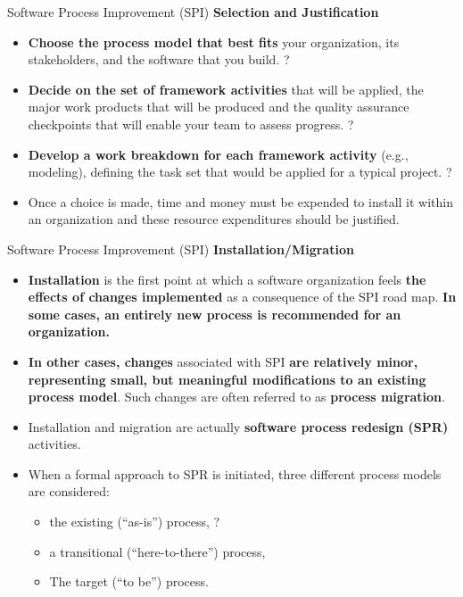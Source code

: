 \documentclass{beamer}
\begin{document}
\begin{frame}{Software Process Improvement (SPI)}
	\textbf{Selection and Justification}
	\begin{itemize}
		\item \textbf{Choose the process model that best fits} your organization, its stakeholders, and the software that you build. ?
		\item \textbf{Decide on the set of framework activities }that will be applied, the major work products that will be produced and the quality assurance checkpoints that will enable your team to assess progress. ?
		\item \textbf{Develop a work breakdown for each framework activity} (e.g., modeling), defining the task set that would be applied for a typical project. ?
		\item Once a choice is made, time and money must be expended to install it within an organization and these resource expenditures should be justified.
	\end{itemize}
\end{frame}
\begin{frame}{Software Process Improvement (SPI)}
	\textbf{Installation/Migration}
	\begin{itemize}
		\item \textbf{Installation} is the first point at which a software organization feels \textbf{the effects of changes implemented} as a 
		consequence of the SPI road map. \textbf{In some cases, an entirely new process is recommended for an 
			organization. }
		\item \textbf{In other cases, changes} associated with SPI\textbf{ are relatively minor, representing small, but meaningful 
		modifications to an existing process model}. Such changes are often referred to as\textbf{ process migration}. 
		\item Installation and migration are actually \textbf{software process redesign (SPR)} activities. 
		\item When a formal approach to SPR is initiated, three different 
		process models are considered:
		
		\begin{itemize}
			\item the existing (“as-is”) process, ?
			\item a transitional (“here-to-there”) process,
			\item The target (“to be”) process.
		\end{itemize}
	\end{itemize}
\end{frame}
\end{document}
